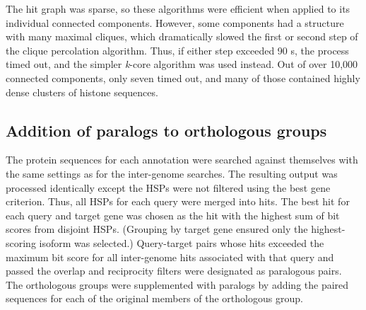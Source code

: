 The hit graph was sparse, so these algorithms were efficient when applied to its individual connected components. However, some components had a structure with many maximal cliques, which dramatically slowed the first or second step of the clique percolation algorithm. Thus, if either step exceeded 90 s, the process timed out, and the simpler \textit{k}-core algorithm was used instead. Out of over 10,000 connected components, only seven timed out, and many of those contained highly dense clusters of histone sequences.

\subsection{Addition of paralogs to orthologous groups}
The protein sequences for each annotation were searched against themselves with the same settings as for the inter-genome searches. The resulting output was processed identically except the HSPs were not filtered using the best gene criterion. Thus, all HSPs for each query were merged into hits. The best hit for each query and target gene was chosen as the hit with the highest sum of bit scores from disjoint HSPs. (Grouping by target gene ensured only the highest-scoring isoform was selected.) Query-target pairs whose hits exceeded the maximum bit score for all inter-genome hits associated with that query and passed the overlap and reciprocity filters were designated as paralogous pairs. The orthologous groups were supplemented with paralogs by adding the paired sequences for each of the original members of the orthologous group.

